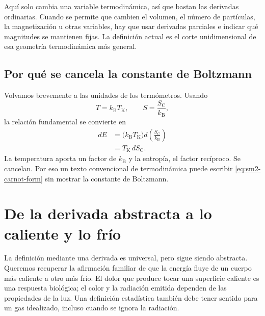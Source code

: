 Aquí solo cambia una variable termodinámica, así que bastan las derivadas ordinarias. Cuando se permite que cambien el volumen, el número de partículas, la magnetización u otras variables, hay que usar derivadas parciales e indicar qué magnitudes se mantienen fijas. La definición actual es el corte unidimensional de esa geometría termodinámica más general.

\subsection{Por qué se cancela la constante de Boltzmann}

Volvamos brevemente a las unidades de los termómetros. Usando
\[
 T=k_{\mathrm B}T_{\mathrm K},
 \qquad
 S=\frac{S_{\mathrm C}}{k_{\mathrm B}},
\]
la relación fundamental se convierte en
\begin{align}
 dE
 &=\bigl(k_{\mathrm B}T_{\mathrm K}\bigr)
   d\left(\frac{S_{\mathrm C}}{k_{\mathrm B}}\right)\\
 &=T_{\mathrm K}\,dS_{\mathrm C}.
 \label{eq:sm2-carnot-form}
\end{align}
La temperatura aporta un factor de \(k_{\mathrm B}\) y la entropía, el factor recíproco. Se cancelan. Por eso un texto convencional de termodinámica puede escribir \eqref{eq:sm2-carnot-form} sin mostrar la constante de Boltzmann.

\begin{classroomqa}
\end{classroomqa}

\section{De la derivada abstracta a lo caliente y lo frío}

La definición mediante una derivada es universal, pero sigue siendo abstracta. Queremos recuperar la afirmación familiar de que la energía fluye de un cuerpo más caliente a otro más frío. El dolor que produce tocar una superficie caliente es una respuesta biológica; el color y la radiación emitida dependen de las propiedades de la luz. Una definición estadística también debe tener sentido para un gas idealizado, incluso cuando se ignora la radiación.

